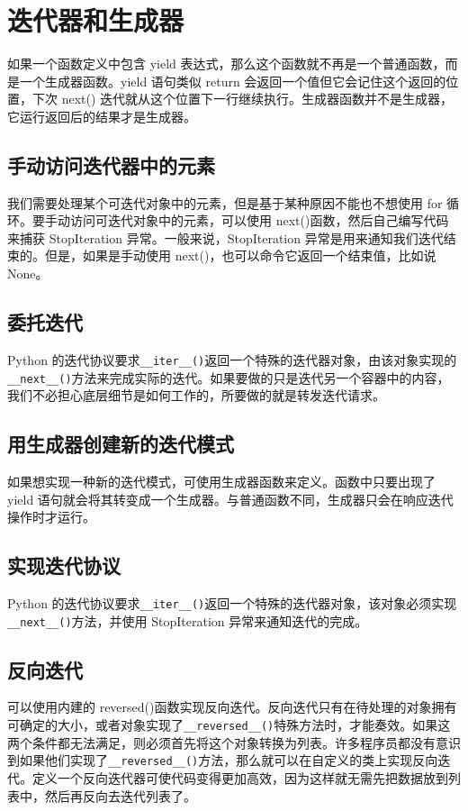 \chapter{迭代器和生成器\label{ch04}}
如果一个函数定义中包含 yield 表达式，那么这个函数就不再是一个普通函数，而是一个生成器函数。yield 语句类似 return 会返回一个值但它会记住这个返回的位置，下次 next() 迭代就从这个位置下一行继续执行。生成器函数并不是生成器，它运行返回后的结果才是生成器。
\section{手动访问迭代器中的元素}
我们需要处理某个可迭代对象中的元素，但是基于某种原因不能也不想使用 for 循环。要手动访问可迭代对象中的元素，可以使用 next()函数，然后自己编写代码来捕获 StopIteration 异常。一般来说，StopIteration 异常是用来通知我们迭代结束的。但是，如果是手动使用 next()，也可以命令它返回一个结束值，比如说 None。

\section{委托迭代}
Python 的迭代协议要求\verb|__iter__()|返回一个特殊的迭代器对象，由该对象实现的\verb|__next__()|方法来完成实际的迭代。如果要做的只是迭代另一个容器中的内容，我们不必担心底层细节是如何工作的，所要做的就是转发迭代请求。
\section{用生成器创建新的迭代模式}
如果想实现一种新的迭代模式，可使用生成器函数来定义。函数中只要出现了 yield 语句就会将其转变成一个生成器。与普通函数不同，生成器只会在响应迭代操作时才运行。
\section{实现迭代协议}
Python 的迭代协议要求\verb|__iter__()|返回一个特殊的迭代器对象，该对象必须实现\verb|__next__()|方法，并使用 StopIteration 异常来通知迭代的完成。
\section{反向迭代}
可以使用内建的 reversed()函数实现反向迭代。反向迭代只有在待处理的对象拥有可确定的大小，或者对象实现了\verb|__reversed__()|特殊方法时，才能奏效。如果这两个条件都无法满足，则必须首先将这个对象转换为列表。许多程序员都没有意识到如果他们实现了\verb|__reversed__()|方法，那么就可以在自定义的类上实现反向迭代。定义一个反向迭代器可使代码变得更加高效，因为这样就无需先把数据放到列表中，然后再反向去迭代列表了。
